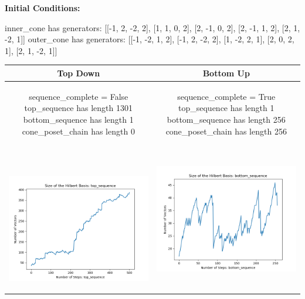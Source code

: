 \documentclass[10pt]{article}
\begin{document}
\textbf{Initial Conditions:}
\begin{SAGE}
inner_cone has generators: 
[[-1, 2, -2, 2], [1, 1, 0, 2], [2, -1, 0, 2], [2, -1, 1, 2], [2, 1, -2, 1]]
outer_cone has generators: 
[[-1, -2, 1, 2], [-1, 2, -2, 2], [1, -2, 2, 1], [2, 0, 2, 1], [2, 1, -2, 1]]

\end{SAGE}
\begin{tabular}{c|c}
\textbf{Top Down} & \textbf{Bottom Up} \\ \hline  
\begin{SAGE}
	sequence_complete = False
	top_sequence has length 1301
	bottom_sequence has length 1
	cone_poset_chain has length 0
\end{SAGE} 
&
\begin{SAGE}
	sequence_complete = True
	top_sequence has length 1
	bottom_sequence has length 256
	cone_poset_chain has length 256
\end{SAGE} 
\\ \hline
\
\begin{minipage}{.45\textwidth}
\includegraphics[width=\textwidth]{"DATA/4d/5 generators 2 bound J/top_sequence SIZE"}
\end{minipage} &
\begin{minipage}{.45\textwidth}
\includegraphics[width=\textwidth]{"DATA/4d/5 generators 2 bound J bottomup/bottom_sequence SIZE"}

\end{minipage}
\end{tabular}
\end{document}
